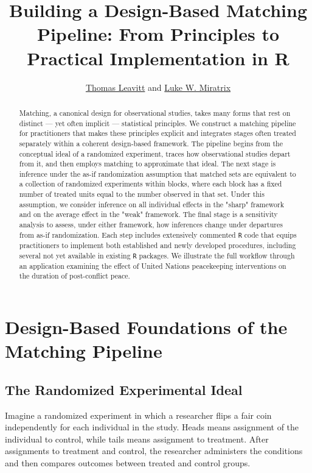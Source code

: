 \documentclass[
  12pt,
  leqno]{article}
\title{Building a Design-Based Matching Pipeline: From Principles to
Practical Implementation in R}
\author{\href{mailto:thomas.leavitt@baruch.cuny.edu}{Thomas Leavitt} and
\href{mailto:luke_miratrix@gse.harvard.edu }{Luke W. Miratrix}}
\date{}
\begin{document}
\maketitle

\begin{abstract}
\singlespacing
\noindent Matching, a canonical design for observational studies, takes many forms that rest on distinct --- yet often implicit --- statistical principles. We construct a matching pipeline for practitioners that makes these principles explicit and integrates stages often treated separately within a coherent design-based framework. The pipeline begins from the conceptual ideal of a randomized experiment, traces how observational studies depart from it, and then employs matching to approximate that ideal. The next stage is inference under the as-if randomization assumption that matched sets are equivalent to a collection of randomized experiments within blocks, where each block has a fixed number of treated units equal to the number observed in that set. Under this assumption, we consider inference on all individual effects in the "sharp" framework and on the average effect in the "weak" framework. The final stage is a sensitivity analysis to assess, under either framework, how inferences change under departures from as-if randomization. Each step includes extensively commented \texttt{R} code that equips practitioners to implement both established and newly developed procedures, including several not yet available in existing \texttt{R} packages. We illustrate the full workflow through an application examining the effect of United Nations peacekeeping interventions on the duration of post-conflict peace.
\end{abstract}

\newpage

\section{Design-Based Foundations of the Matching
Pipeline}\label{design-based-foundations-of-the-matching-pipeline}

\subsection{The Randomized Experimental
Ideal}\label{the-randomized-experimental-ideal}

Imagine a randomized experiment in which a researcher flips a fair coin
independently for each individual in the study. Heads means assignment
of the individual to control, while tails means assignment to treatment.
After assignments to treatment and control, the researcher administers
the conditions and then compares outcomes between treated and control
groups.
\end{document}
